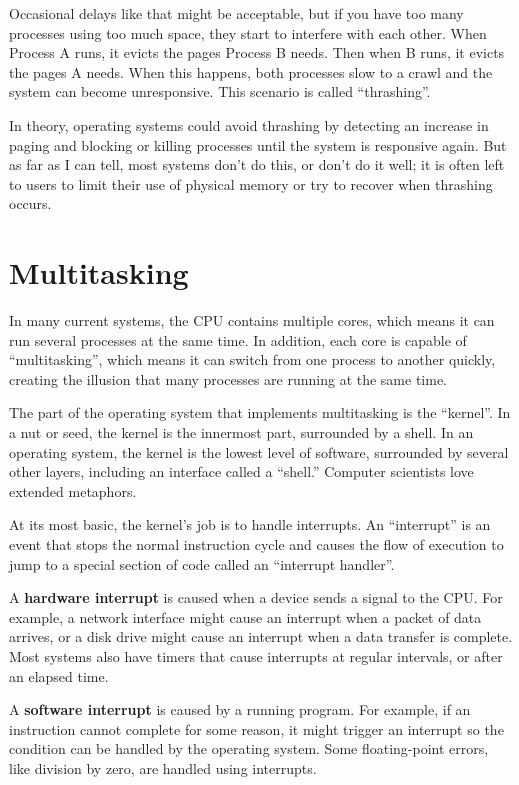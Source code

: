 \documentclass[12pt]{book}
\begin{document}
{Occasional delays like that might be acceptable, but if you have too
many processes using too much space, they start to interfere with each
other.  When Process A runs, it evicts the pages Process B needs.
Then when B runs, it evicts the pages A needs.  When this happens,
both processes slow to a crawl and the system can become unresponsive.
This scenario is called ``thrashing''.

In theory, operating systems could avoid thrashing by detecting an
increase in paging and blocking or killing processes until the system
is responsive again.  But as far as I can tell, most systems don't do
this, or don't do it well; it is often left to users to limit their
use of physical memory or try to recover when thrashing occurs.


\chapter{Multitasking}

In many current systems, the CPU contains multiple cores, which means
it can run several processes at the same time.  In addition, each core
is capable of ``multitasking'', which means it can switch from one
process to another quickly, creating the illusion that many processes
are running at the same time.

The part of the operating system that implements multitasking is
the ``kernel''.  In a nut or seed, the kernel is the innermost
part, surrounded by a shell.  In an operating system, the kernel
is the lowest level of software, surrounded by several other
layers, including an interface called a ``shell.''  Computer
scientists love extended metaphors.

At its most basic, the kernel's job is to
handle interrupts.  An ``interrupt'' is an event that stops the
normal instruction cycle and causes the flow of execution to jump to a
special section of code called an ``interrupt handler''.


A {\bf hardware interrupt} is caused when a device sends a signal to the
CPU.  For example, a network interface might cause an interrupt when
a packet of data arrives, or a disk drive might cause an interrupt
when a data transfer is complete.  Most systems also have timers that
cause interrupts at regular intervals, or after an elapsed time.

A {\bf software interrupt} is caused by a running program.  For example, if
an instruction cannot complete for some reason, it might trigger an
interrupt so the condition can be handled by the operating system.
Some floating-point errors, like division by zero, are handled
using interrupts.

}
\end{document}
